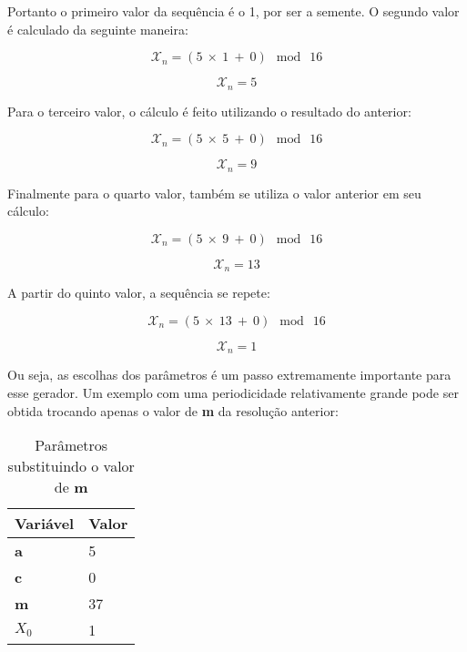 Portanto o primeiro valor da sequência é o 1, por ser a semente. O segundo valor é calculado da seguinte maneira: 

\begin{equation}
	\label{Cálculo do segundo valor}
	\mathcal{X}_n = ( 5 \: \times \: 1 \: + \: 0) \: \bmod \: 16
\end{equation}

\begin{equation}
	\label{Resultado do segundo valor}
	\mathcal{X}_n = 5
\end{equation}

Para o terceiro valor, o cálculo é feito utilizando o resultado do anterior:

\begin{equation}
	\label{Cálculo do terceiro valor}
	\mathcal{X}_n = ( 5 \: \times \: 5\: +\: 0)\: \bmod \: 16
\end{equation}

\begin{equation}
	\label{Resultado do terceiro valor}
	\mathcal{X}_n = 9
\end{equation}

Finalmente para o quarto valor, também se utiliza o valor anterior em seu cálculo:

\begin{equation}
	\label{Cálculo do quarto valor}
	\mathcal{X}_n = ( 5 \: \times \: 9 \: + \: 0) \: \bmod \: 16
\end{equation}

\begin{equation}
	\label{Resultado do quarto valor}
	\mathcal{X}_n = 13
\end{equation}

A partir do quinto valor, a sequência se repete:

\begin{equation}
	\label{Cálculo do quinto valor}
	\mathcal{X}_n = ( 5 \: \times \: 13 \: + \: 0) \: \bmod \: 16
\end{equation}

\begin{equation}
	\label{Resultado do quinto valor}
	\mathcal{X}_n = 1
\end{equation}

Ou seja, as escolhas dos parâmetros é um passo extremamente importante para esse gerador. Um exemplo com uma periodicidade relativamente grande pode ser obtida trocando apenas o valor de \textbf{m} da resolução anterior:

\begin{table}[h]
	\centering
	\begin{tabular}{|l|l|}	
		\hline
		Variável & Valor \\ \hline
		\textbf{a} & 5 \\ \hline
		\textbf{c} & 0 \\ \hline
		\textbf{m} & 37 \\ \hline
		\textbf{$X_0$} & 1 \\ \hline
	\end{tabular}
	\caption{Parâmetros substituindo o valor de \textbf{m}}
\end{table}

